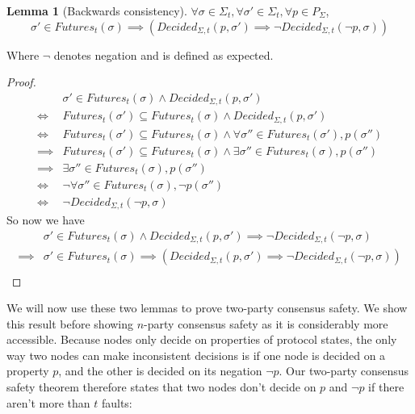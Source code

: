 \documentclass{article}
\theoremstyle{definition}
\newtheorem{lemma}{Lemma}
\begin{document}
\begin{lemma}[Backwards consistency]
\label{lem:backw_safe}
$\forall \sigma \in \Sigma_t, \forall \sigma' \in \Sigma_t, \forall p \in P_\Sigma$,
$$
\sigma' \in Futures_t(\sigma) \implies (Decided_{\Sigma, t}(p,\sigma') \implies \neg Decided_{\Sigma, t}(\neg p,\sigma))
$$
\end{lemma}

Where $\neg$ denotes negation and is defined as expected. %

\begin{proof}
\begin{align}
&\sigma' \in Futures_t(\sigma)  \land Decided_{\Sigma, t}(p,\sigma') \\
\iff &Futures_t(\sigma') \subseteq Futures_t(\sigma) \land Decided_{\Sigma, t}(p, \sigma') \\
\iff &Futures_t(\sigma') \subseteq Futures_t(\sigma) \land \forall \sigma'' \in Futures_t(\sigma'), p(\sigma'') \\
\implies &Futures_t(\sigma') \subseteq Futures_t(\sigma) \land \exists \sigma'' \in Futures_t(\sigma), p(\sigma'') \\
\implies &\exists \sigma'' \in Futures_t(\sigma), p(\sigma'') \\
\iff &\neg \forall \sigma'' \in Futures_t(\sigma), \neg p(\sigma'') \\
\iff &\neg Decided_{\Sigma, t}(\neg p, \sigma)
\end{align}
So now we have
\begin{align}
&\sigma' \in Futures_t(\sigma) \land Decided_{\Sigma, t}(p,\sigma') \implies \neg Decided_{\Sigma, t}(\neg p, \sigma)\\
\implies &\sigma' \in Futures_t(\sigma) \implies (Decided_{\Sigma, t}(p,\sigma') \implies \neg Decided_{\Sigma, t}(\neg p, \sigma)) \\
\end{align}
\end{proof}

We will now use these two lemmas to prove two-party consensus safety. We show this result before showing $n$-party consensus safety as it is considerably more accessible. Because nodes only decide on properties of protocol states, the only way two nodes can make inconsistent decisions is if one node is decided on a property $p$, and the other is decided on its negation $\neg p$. Our two-party consensus safety theorem therefore states that two nodes don't decide on $p$ and $\neg p$ if there aren't more than $t$ faults:
\end{document}
